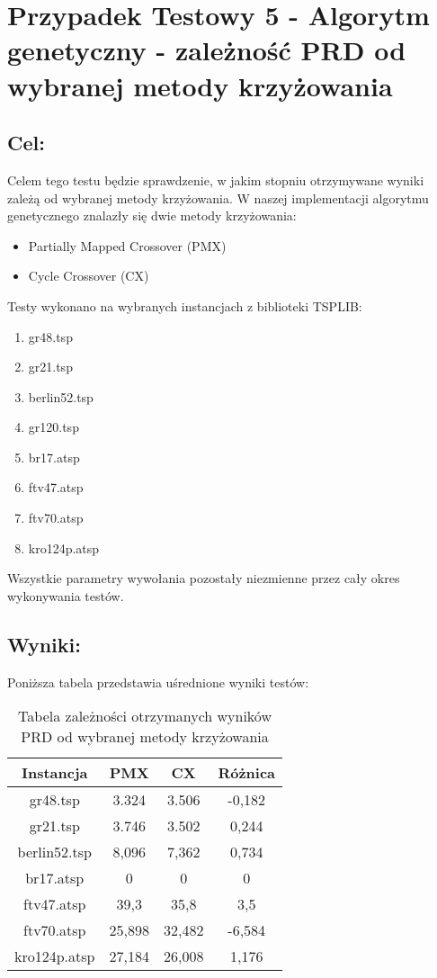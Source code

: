 \section{Przypadek Testowy 5 - Algorytm genetyczny - zależność PRD od wybranej metody krzyżowania}
  \subsection{Cel:}
    Celem tego testu będzie sprawdzenie, w jakim stopniu otrzymywane wyniki zależą od wybranej metody krzyżowania. W naszej implementacji
    algorytmu genetycznego znalazły się dwie metody krzyżowania:
    \begin{itemize}
      \item Partially Mapped Crossover (PMX)
      \item Cycle Crossover (CX)
    \end{itemize}
    Testy wykonano na wybranych instancjach z biblioteki TSPLIB:
    \begin{enumerate}
      \item gr48.tsp
      \item gr21.tsp
      \item berlin52.tsp
      \item gr120.tsp
      \item br17.atsp
      \item ftv47.atsp
      \item ftv70.atsp
      \item kro124p.atsp 
    \end{enumerate}
    Wszystkie parametry wywołania pozostały niezmienne przez cały okres wykonywania testów.
  \subsection{Wyniki: }
    Poniższa tabela przedstawia uśrednione wyniki testów:
    \begin{table}[!ht]
      \centering
      \begin{tabular}{| c | c | c | c |}
        \hline
        Instancja & PMX & CX & Różnica \\
        \hline
        gr48.tsp & 3.324& 3.506 & -0,182 \\
        gr21.tsp & 3.746& 3.502 & 0,244 \\
        berlin52.tsp & 8,096 & 7,362 & 0,734 \\
        br17.atsp & 0 & 0 & 0 \\
        ftv47.atsp & 39,3 & 35,8 & 3,5 \\
        ftv70.atsp & 25,898 & 32,482 & -6,584 \\
        kro124p.atsp & 27,184 & 26,008 & 1,176 \\

        \hline
          
      \end{tabular}
      \caption{Tabela zależności otrzymanych wyników PRD od wybranej metody krzyżowania}
    \end{table}
